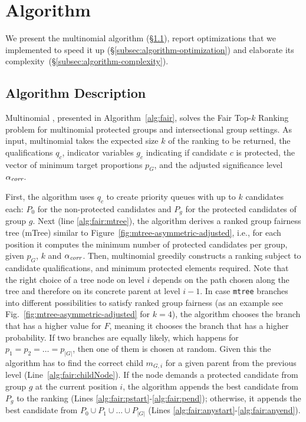 \section{Algorithm}\label{sec:algorithms}
We present the multinomial \algoFAIR algorithm (\S\ref{subsec:algorithm-description}), report optimizations that we implemented to speed it up (\S\ref{subsec:algorithm-optimization}) and elaborate its complexity~(\S\ref{subsec:algorithm-complexity}).

\subsection{Algorithm Description}\label{subsec:algorithm-description}
Multinomial \algoFAIR, presented in Algorithm~\ref{alg:fair}, solves the {\sc Fair Top-$k$ Ranking} problem for multinomial protected groups and intersectional group settings.
%
As input, multinomial \algoFAIR takes 
the expected size $k$ of the ranking to be returned,
the qualifications $q_c$, 
indicator variables $g_c$ indicating if candidate $c$ is protected,
the vector of minimum target proportions $p_G$, and
the adjusted significance level $\alpha_\textit{corr}$.

First, the algorithm uses $q_c$ to create priority queues with up to $k$ candidates each: $P_0$ for the non-protected candidates and $P_g$ for the protected candidates of group $g$.
%
Next (line \ref{alg:fair:mtree}), the algorithm derives a ranked group fairness tree (mTree) similar to Figure~\ref{fig:mtree-asymmetric-adjusted}, i.e., for each position it computes the minimum number of protected candidates per group, given $p_G$, $k$ and $\alpha_\textit{corr}$.
%
Then, multinomial \algoFAIR greedily constructs a ranking subject to candidate qualifications, and minimum protected elements required.
%
Note that the right choice of a tree node on level $i$ depends on the path chosen along the tree and therefore on its concrete parent at level $i-1$. 
%
In case \texttt{mtree} branches into different possibilities to satisfy ranked group fairness (as an example see Fig.~\ref{fig:mtree-asymmetric-adjusted} for $k=4$), the algorithm chooses the branch that has a higher value for $F$, meaning it chooses the branch that has a higher probability.
%
If two branches are equally likely, which happens for $p_1 = p_2 = \ldots = p_{|G|}$, then one of them is chosen at random.
%
Given this the algorithm has to find the correct child $m_{G,i}$ for a given parent from the previous level (Line~\ref{alg:fair:childNode}).
%
If the node demands a protected candidate from group $g$ at the current position $i$, the algorithm appends the best candidate from $P_g$ to the ranking (Lines \ref{alg:fair:pstart}-\ref{alg:fair:pend}); otherwise, it appends the best candidate from $P_0 \cup P_1 \cup \ldots \cup P_{|G|}$ (Lines \ref{alg:fair:anystart}-\ref{alg:fair:anyend}).
%

